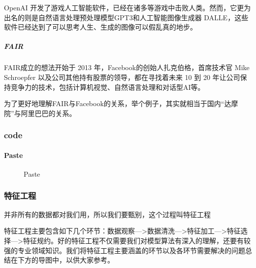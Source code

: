 \documentclass[letterpaper,11pt,english]{sphinxmanual}
\begin{document}
OpenAI
开发了游戏人工智能软件，已经在诸多等游戏中击败人类。然而，它更为出名的则是自然语言处理预处理模型GPT\sphinxhyphen{}3和人工智能图像生成器
DALL\sphinxhyphen{}E，这些软件已经达到了可以思考人生、生成的图像可以假乱真的地步。


\subparagraph{FAIR}
\label{\detokenize{chapter_AI_dive/AI_Research:fair}}
FAIR成立的想法开始于 2013 年，Facebook的创始人扎克伯格，首席技术官 Mike
Schroepfer 以及公司其他持有股票的领导，都在寻找着未来 10 到 20
年让公司保持竞争力的技术，包括计算机视觉、自然语言处理和对话型AI等。

为了更好地理解FAIR与Facebook的关系，举个例子，其实就相当于国内“达摩院”与阿里巴巴的关系。%
\begin{footnote}[824]\sphinxAtStartFootnote
{}
%
\end{footnote}


\subsubsection{code}
\label{\detokenize{chapter_AI_dive/code:code}}\label{\detokenize{chapter_AI_dive/code::doc}}


\paragraph{Paste}
\label{\detokenize{chapter_AI_dive/code:paste}}
\begin{figure}[H]
\centering
\capstart

\noindent{}
\caption{Paste}\label{\detokenize{chapter_AI_dive/code:id1}}\end{figure}


\subsubsection{特征工程}
\label{\detokenize{chapter_AI_dive/feature_engineering:id1}}\label{\detokenize{chapter_AI_dive/feature_engineering::doc}}
并非所有的数据都对我们用，所以我们要甄别，这个过程叫特征工程%
\begin{footnote}[825]\sphinxAtStartFootnote
{}
%
\end{footnote}

特征工程主要包含如下几个环节：数据观察—>数据清洗—>特征加工—>特征选择—>特征规约。好的特征工程不仅需要我们对模型算法有深入的理解，还要有较强的专业领域知识。我们将特征工程主要涵盖的环节以及各环节需要解决的问题总结在下方的导图中，以供大家参考。
%
\begin{footnote}[826]\sphinxAtStartFootnote
{}
%
\end{footnote}
\end{document}
